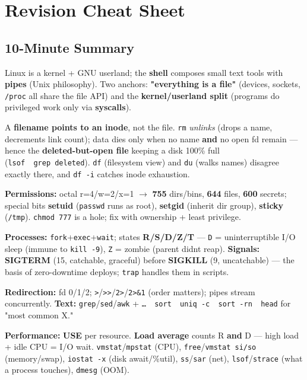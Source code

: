 \documentclass[11pt]{article}
\begin{document}
\section{Revision Cheat Sheet}\label{revision-cheat-sheet}

\subsection{10-Minute Summary}\label{10-minute-summary}

Linux is a kernel + GNU userland; the \textbf{shell} composes small text tools with \textbf{pipes} (Unix philosophy). Two anchors: \textbf{"everything is a file"} (devices, sockets, \texttt{/proc} all share the file API) and the \textbf{kernel/userland split} (programs do privileged work only via \textbf{syscalls}).

A \textbf{filename points to an inode}, not the file. \texttt{rm} \emph{unlinks} (drops a name, decrements link count); data dies only when no name \textbf{and} no open fd remain --- hence the \textbf{deleted-but-open file} keeping a disk 100\% full (\texttt{lsof\ \textbar{}\ grep\ deleted}). \texttt{df} (filesystem view) and \texttt{du} (walks names) disagree exactly there, and \texttt{df\ -i} catches inode exhaustion.

\textbf{Permissions:} octal r=4/w=2/x=1 \(\rightarrow\) \textbf{755} dirs/bins, \textbf{644} files, \textbf{600} secrets; special bits \textbf{setuid} (\texttt{passwd} runs as root), \textbf{setgid} (inherit dir group), \textbf{sticky} (\texttt{/tmp}). \texttt{chmod\ 777} is a hole; fix with ownership + least privilege.

\textbf{Processes:} \texttt{fork}+\texttt{exec}+\texttt{wait}; states \textbf{R/S/D/Z/T} --- \texttt{D} = uninterruptible I/O sleep (immune to \texttt{kill\ -9}), \texttt{Z} = zombie (parent didn\textquotesingle t reap). \textbf{Signals:} \textbf{SIGTERM} (15, catchable, graceful) before \textbf{SIGKILL} (9, uncatchable) --- the basis of zero-downtime deploys; \texttt{trap} handles them in scripts.

\textbf{Redirection:} fd 0/1/2; \texttt{\textgreater{}}/\texttt{\textgreater{}\textgreater{}}/\texttt{2\textgreater{}}/\texttt{2\textgreater{}\&1} (order matters); pipes stream concurrently. \textbf{Text:} \texttt{grep}/\texttt{sed}/\texttt{awk} + \texttt{…\ \textbar{}\ sort\ \textbar{}\ uniq\ -c\ \textbar{}\ sort\ -rn\ \textbar{}\ head} for "most common X."

\textbf{Performance:} \textbf{USE} per resource. \textbf{Load average} counts R \textbf{and} D --- high load + idle CPU = I/O wait. \texttt{vmstat}/\texttt{mpstat} (CPU), \texttt{free}/\texttt{vmstat\ si/so} (memory/swap), \texttt{iostat\ -x} (disk await/\%util), \texttt{ss}/\texttt{sar} (net), \texttt{lsof}/\texttt{strace} (what a process touches), \texttt{dmesg} (OOM).
\end{document}

